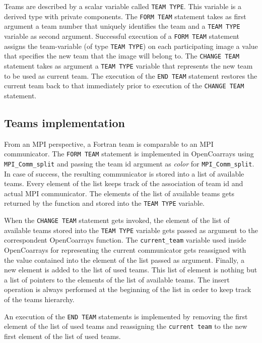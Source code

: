Teams are described by a scalar variable called \texttt{TEAM TYPE}. This variable is a derived type with private components.
The \texttt{FORM TEAM} statement takes as first argument a team number that uniquely identifies the team and a \texttt{TEAM TYPE}
variable as second argument.
Successful execution of a \texttt{FORM TEAM} statement assigns the team-variable (of type \texttt{TEAM TYPE}) on each
participating image a value that specifies the new team that the image will belong to.
The \texttt{CHANGE TEAM} statement takes as argument a \texttt{TEAM TYPE} variable that represents the new team to be used as
current team. The execution of the \texttt{END TEAM} statement restores the current team back
to that immediately prior to execution of the \texttt{CHANGE TEAM} statement.

\subsection{Teams implementation}\label{subsec:teams_implementation}

From an MPI perspective, a Fortran team is comparable to an MPI communicator. The \texttt{FORM TEAM} statement is implemented in OpenCoarrays
using \texttt{MPI\_Comm\_split} and passing the team id argument as \textit{color} for \texttt{MPI\_Comm\_split}.
In case of success, the resulting communicator is stored into a list of available teams.
Every element of the list keeps track of the association of team id and actual MPI communicator.
The elements of the list of available teams gets returned by the function and stored into the \texttt{TEAM TYPE} variable.

When the \texttt{CHANGE TEAM} statement gets invoked, the element of the list of available teams stored into the \texttt{TEAM TYPE} variable
gets passed as argument to the correspondent OpenCoarrays function. The \texttt{current\_team} variable used inside OpenCoarrays for
representing the current communicator gets reassigned with the value contained into the element of the list passed as argument.
Finally, a new element is added to the list of used teams. This list of element is nothing but a list of pointers to the elements of the list
of available teams. The insert operation is always performed at the beginning of the list in order to keep track of the teams hierarchy.

An execution of the \texttt{END TEAM} statements is implemented by removing the first element of the list of used teams and reassigning the
\texttt{current team} to the new first element of the list of used teams.


